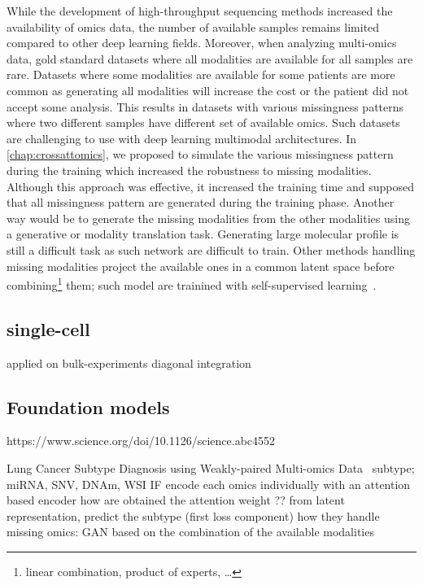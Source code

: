 \documentclass[../main.tex]{subfiles}
\begin{document}
		While the development of high-throughput sequencing methods increased the availability of omics data, the number of available samples remains limited compared to other deep learning fields.
		Moreover, when analyzing multi-omics data, gold standard datasets where all modalities are available for all samples are rare.
		Datasets where some modalities are available for some patients are more common as generating all modalities will increase the cost or the patient did not accept some analysis.
		This results in datasets with various missingness patterns where two different samples have different set of available omics.
		Such datasets are challenging to use with deep learning multimodal architectures.
		In \cref{chap:crossattomics}, we proposed to simulate the various missingness pattern during the training which increased the robustness to missing modalities.
		Although this approach was effective, it increased the training time and supposed that all missingness pattern are generated during the training phase.
		Another way would be to generate the missing modalities from the other modalities using a generative or modality translation task.
		Generating large molecular profile is still a difficult task as such network are difficult to train.
		Other methods handling missing modalities project the available ones in a common latent space before combining\footnote{linear combination, product of experts, \dots} them; such model are trainined with self-supervised learning~\cite{Lee2021AVI}.

	\subsection{single-cell}
		applied on bulk-experiments
		diagonal integration
		\the\textwidth

		\the\textheight

	\subsection{Foundation models}

		https://www.science.org/doi/10.1126/science.abc4552

		Lung Cancer Subtype Diagnosis using Weakly-paired Multi-omics Data~\cite{Wang2022}
		subtype; miRNA, SNV, DNAm, WSI
		IF
		encode each omics individually with an attention based encoder
		how are obtained the attention weight ??
		from latent representation, predict the subtype (first loss component)
		how they handle missing omics: GAN based on the combination of the available modalities
\end{document}
